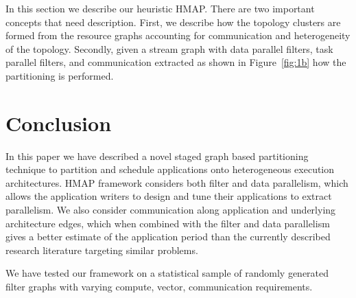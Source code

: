 \documentclass[10pt, conference, compsocconf, reqno]{IEEEtran}
\begin{document}
In this section we describe our heuristic HMAP. There are two
important concepts that need description. First, we describe how the
topology clusters are formed from the resource graphs accounting for
communication and heterogeneity of the topology. Secondly, given a
stream graph with data parallel filters, task parallel filters, and
communication extracted as shown in Figure~\ref{fig:1b} how the partitioning
is performed.

%



% 





\section{Conclusion}
\label{sec:conclusion}

In this paper we have described a novel staged graph based partitioning
technique to partition and schedule applications onto heterogeneous
execution architectures. HMAP framework considers both filter and data
parallelism, which allows the application writers to design and tune their
applications to extract parallelism. We also consider communication along
application and underlying architecture edges, which when combined with the
filter and data parallelism gives a better estimate of the application period
than the currently described research literature targeting similar problems.

We have tested our framework on a statistical sample of randomly
generated filter graphs with varying compute, vector, communication
requirements.


\end{document}
